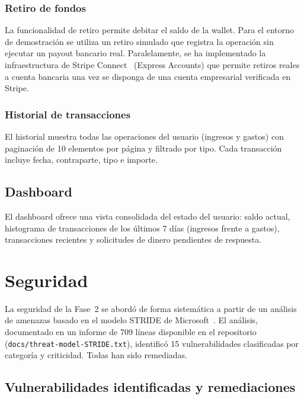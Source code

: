 \subsection{Retiro de fondos}
La funcionalidad de retiro permite debitar el saldo de la wallet. Para el entorno de demostración se utiliza un retiro simulado que registra la operación sin ejecutar un payout bancario real. Paralelamente, se ha implementado la infraestructura de Stripe Connect~\cite{stripeconnect} (Express Accounts) que permite retiros reales a cuenta bancaria una vez se disponga de una cuenta empresarial verificada en Stripe.

\subsection{Historial de transacciones}
El historial muestra todas las operaciones del usuario (ingresos y gastos) con paginación de 10 elementos por página y filtrado por tipo. Cada transacción incluye fecha, contraparte, tipo e importe.

\section{Dashboard}

El dashboard ofrece una vista consolidada del estado del usuario: saldo actual, histograma de transacciones de los últimos 7 días (ingresos frente a gastos), transacciones recientes y solicitudes de dinero pendientes de respuesta.

\chapter{Seguridad}\label{ch:seguridad}

La seguridad de la Fase~2 se abordó de forma sistemática a partir de un análisis de amenazas basado en el modelo STRIDE de Microsoft~\cite{stride}. El análisis, documentado en un informe de 709 líneas disponible en el repositorio (\texttt{docs/threat-model-STRIDE.txt}), identificó 15 vulnerabilidades clasificadas por categoría y criticidad. Todas han sido remediadas.

\section{Vulnerabilidades identificadas y remediaciones}

